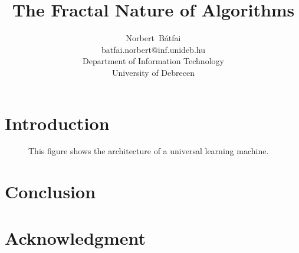 \documentclass[a4paper]{article}
\begin{document}
\title{The Fractal Nature of Algorithms}
\author{Norbert~B\'atfai\\batfai.norbert@inf.unideb.hu\\Department of Information Technology\\University of Debrecen}

\maketitle

\begin{abstract}

\end{abstract}

\section{Introduction}

\cite{TheorRobopsy}

\begin{figure}[!h]
\centering
\scalebox{1}{}
\caption{This figure shows the architecture of a universal learning machine.\label{fig_ULM}}
\end{figure}

\section{Conclusion}

\section{Acknowledgment}


\end{document}

